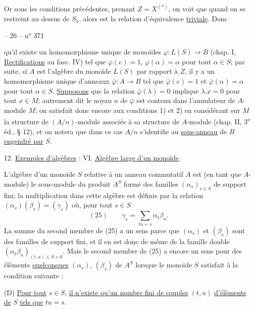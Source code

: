 Or sous les conditions précédentes, prenant $Z=X^{(*)}$, on voit que quand on se restreint au dessus de $S_a$, alors
est la relation d'équivalence \uline{triviale}. Donc
\begin{center}-- 26 -- \hfill n° 371\end{center}
qu'il existe un homomorphisme unique de monoïdes $\varphi:L(S)\to B$ (chap. I, \uline{Rectifications} au fasc. IV) tel que $\varphi(e)=1$, $\varphi(\alpha)=\alpha$ pour tout $\alpha\in S$; par suite, si $A$ est l'algèbre du monoïde $L(S)$ par rapport à $Z$, il y a un homomorphisme unique d'anneaux $\bar\varphi:A\to B$ tel que $\bar\varphi(e)=1$ et $\bar\varphi(\alpha)=\alpha$ pour tout $\alpha\in S$. \uline{Supposons} que la relation $\bar\varphi(\lambda)=0$ implique $\lambda.x=0$ pour tout $x\in M$; autrement dit le noyau $n$ de $\bar\varphi$ est contenu dans l'annulateur de $A$-module $M$; on satisfait donc encore aux conditions 1) et 2) en considérant sur $M$ la structure de $(A/n)$-module associée à sa structure de $A$-module (chap. II, 3\textsuperscript{e} éd., § 12), et on notera que dans ce cas $A/n$ s'identifie au \uline{sous-anneau} de $B$ \uline{engendré par} $S$.

12. \uline{Exemples d'algèbres} : VI. \uline{Algèbre large d'un monoïde}.

L'algèbre d'un monoïde $S$ relative à un anneau commutatif $A$ est (en tant que $A$-module) le sous-module du produit $A^S$ formé des familles $(\alpha_s)_{s\in S}$ de support fini; la multiplication dans cette algèbre est définie par la relation $(\alpha_s)(\beta_s)=(\gamma_s)$ où, pour tout $s\in S$
\[
(25)\qquad \gamma_s=\sum_{tu=s}\alpha_t\beta_u.
\]
La somme du second membre de (25) a un sens parce que $(\alpha_s)$ et $(\beta_s)$ sont des familles de support fini, et il en est donc de même de la famille double $(\alpha_t\beta_u)_{(t,u)\in S\times S}$. Mais le second membre de (25) a encore un sens pour des éléments \uline{quelconques} $(\alpha_s)$, $(\beta_s)$ de $A^S$ lorsque le monoïde $S$ satisfait à la condition suivante :

(D) \uline{Pour tout} $s\in S$, \uline{il n'existe qu'un nombre fini de couples} $(t,u)$ \uline{d'éléments de} $S$ \uline{tels que} $tu=s$.

